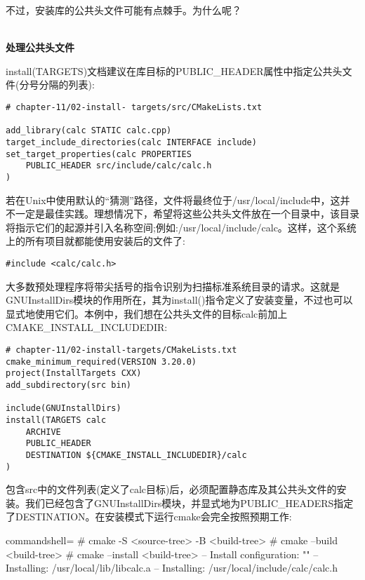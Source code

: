 不过，安装库的公共头文件可能有点棘手。为什么呢？

\hspace*{\fill} \\ %
\noindent
\textbf{处理公共头文件}

install(TARGETS)文档建议在库目标的PUBLIC\_HEADER属性中指定公共头文件(分号分隔的列表):

\begin{lstlisting}[style=styleCMake]
# chapter-11/02-install- targets/src/CMakeLists.txt

add_library(calc STATIC calc.cpp)
target_include_directories(calc INTERFACE include)
set_target_properties(calc PROPERTIES
	PUBLIC_HEADER src/include/calc/calc.h
)
\end{lstlisting}

若在Unix中使用默认的“猜测”路径，文件将最终位于/usr/local/include中，这并不一定是最佳实践。理想情况下，希望将这些公共头文件放在一个目录中，该目录将指示它们的起源并引入名称空间;例如:/usr/local/include/calc。这样，这个系统上的所有项目就都能使用安装后的文件了:

\begin{lstlisting}[style=styleCXX]
#include <calc/calc.h>
\end{lstlisting}

大多数预处理程序将带尖括号的指令识别为扫描标准系统目录的请求。这就是GNUInstallDirs模块的作用所在，其为install()指令定义了安装变量，不过也可以显式地使用它们。本例中，我们想在公共头文件的目标calc前加上CMAKE\_INSTALL\_INCLUDEDIR:

\begin{lstlisting}[style=styleCMake]
# chapter-11/02-install-targets/CMakeLists.txt
cmake_minimum_required(VERSION 3.20.0)
project(InstallTargets CXX)
add_subdirectory(src bin)

include(GNUInstallDirs)
install(TARGETS calc
	ARCHIVE
	PUBLIC_HEADER
	DESTINATION ${CMAKE_INSTALL_INCLUDEDIR}/calc
)
\end{lstlisting}

包含src中的文件列表(定义了calc目标)后，必须配置静态库及其公共头文件的安装。我们已经包含了GNUInstallDirs模块，并显式地为PUBLIC\_HEADERS指定了DESTINATION。在安装模式下运行cmake会完全按照预期工作:

\begin{tcblisting}{commandshell={}}
# cmake -S <source-tree> -B <build-tree>
# cmake --build <build-tree>
# cmake --install <build-tree>
-- Install configuration: ""
-- Installing: /usr/local/lib/libcalc.a
-- Installing: /usr/local/include/calc/calc.h
\end{tcblisting}

